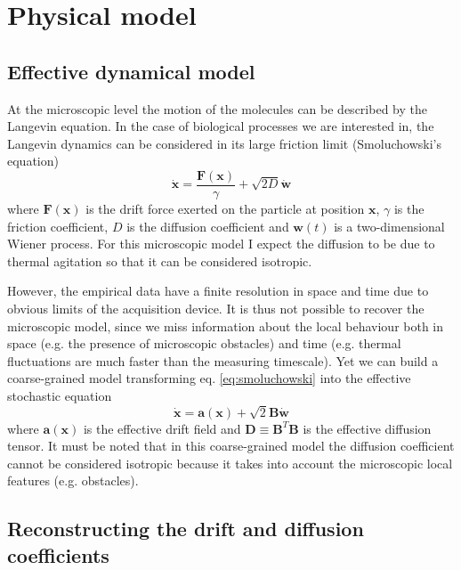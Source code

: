 \documentclass[a4paper]{article}
\begin{document}
\section{Physical model}

\subsection{Effective dynamical model}

At the microscopic level the motion of the molecules can be described by the Langevin equation. In the case of biological processes we are interested in, the Langevin dynamics can be considered in its large friction limit (Smoluchowski's equation)
\begin{equation} \label{eq:smoluchowski}
\dot{\bm{x}} = \frac{\bm{F}(\bm{x})}{\gamma} + \sqrt{2D} \dot{\bm{w}}
\end{equation}
where $\bm{F}(\bm{x})$ is the drift force exerted on the particle at position $\bm{x}$, $\gamma$ is the friction coefficient, $D$ is the diffusion coefficient and $\bm{w}(t)$ is a two-dimensional Wiener process. For this microscopic model I expect the diffusion to be due to thermal agitation so that it can be considered isotropic.

However, the empirical data have a finite resolution in space and time due to obvious limits of the acquisition device. It is thus not possible to recover the microscopic model, since we miss information about the local behaviour both in space (e.g. the presence of microscopic obstacles) and time (e.g. thermal fluctuations are much faster than the measuring timescale). Yet we can build a coarse-grained model transforming eq. \ref{eq:smoluchowski} into the effective stochastic equation \cite{hoze2012} \cite{hoze2014}
\begin{equation} \label{eq:coarse-grained}
\dot{\bm{x}} = \bm{a}(\bm{x}) + \sqrt{2}\bm{B} \dot{\bm{w}}
\end{equation}
where $\bm{a}(\bm{x})$ is the effective drift field and $\bm{D} \equiv \bm{B}^T\bm{B}$ is the effective diffusion tensor. It must be noted that in this coarse-grained model the diffusion coefficient cannot be considered isotropic because it takes into account the microscopic local features (e.g. obstacles).

\subsection{Reconstructing the drift and diffusion coefficients}
\end{document}
